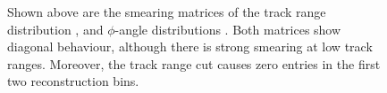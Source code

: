 \begin{figure}[htbp]
    \centering
    \caption[Smearing Matrices of Track Range and $\phi$ Distributions]{Shown above are the smearing matrices of the track range distribution , and $\phi$-angle distributions . Both matrices show diagonal behaviour, although there is strong smearing at low track ranges. Moreover, the track range cut causes zero entries in the first two reconstruction bins.}
    \label{fig:DiagonalSmearing}
\end{figure}

